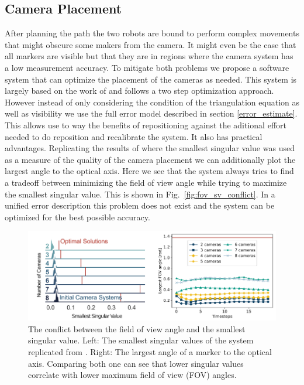 \documentclass[5p,times,procedia]{elsarticle}
\begin{document}
\subsection{Camera Placement}
After planning the path the two robots are bound to perform complex movements that might obscure some makers from the camera.
It might even be the case that all markers are visible but that they are in regions where the camera system has a low measurement accuracy.
To mitigate both problems we propose a software system that can optimize the placement of the cameras as needed.
This system is largely based on the work of \cite{camera_placement} and follows a two step optimization approach.
However instead of only considering the condition of the triangulation equation as well as visibility we use the full error model described in section \ref{error_estimate}.
This allows use to way the benefits of repositioning against the aditional effort needed to do reposition and recalibrate the system.
It also has practical advantages.
Replicating the results of \cite{camera_placement} where the smallest singular value was used as a measure of the quality of the camera placement we can additionally plot the largest angle to the optical axis.
Here we see that the system always tries to find a tradeoff between minimizing the field of view angle while trying to maximize the smallest singular value.
This is shown in Fig.~\ref{fig:fov_sv_conflict}.
In a unified error description this problem does not exist and the system can be optimized for the best possible accuracy.
\begin{figure}[h]
\centering
\includegraphics[width=\columnwidth]{graphics/fov_sv_conflict.png}
\caption{The conflict between the field of view angle and the smallest singular value. Left: The smallest singular values of the system replicated from \cite{camera_placement}. Right: The largest angle of a marker to the optical axis.
 Comparing both one can see that lower singular values correlate with lower maximum field of view (FOV) angles.}
\end{figure}
\end{document}
